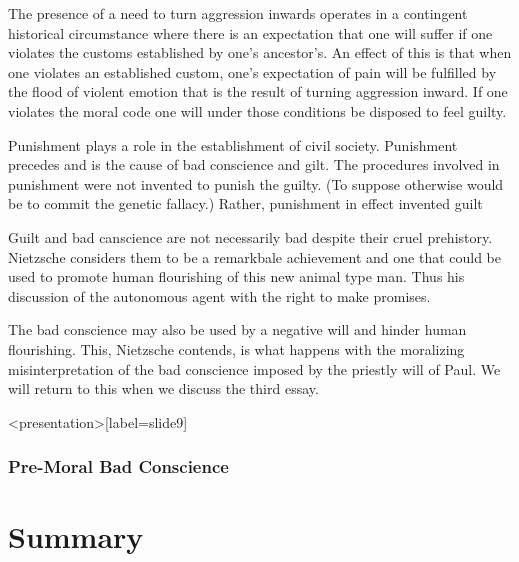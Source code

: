 The presence of a need to turn aggression inwards operates in a contingent historical circumstance where there is an expectation that one will suffer if one violates the customs established by one's ancestor's. An effect of this is that when one violates an established custom, one's expectation of pain will be fulfilled by the flood of violent emotion that is the result of turning aggression inward. If one violates the moral code one will under those conditions be disposed to feel guilty.

Punishment plays a role in the establishment of civil society. Punishment precedes and is the cause of bad conscience and gilt. The procedures involved in punishment were not invented to punish the guilty. (To suppose otherwise would be to commit the genetic fallacy.) Rather, punishment in effect invented guilt

Guilt and bad canscience are not necessarily bad despite their cruel prehistory. Nietzsche considers them to be a remarkbale achievement and one that could be used to promote human flourishing of this new animal type man. Thus his discussion of the autonomous agent with the right to make promises.

The bad conscience may also be used by a negative will and hinder human flourishing. This, Nietzsche contends, is what happens with the moralizing misinterpretation of the bad conscience imposed by the priestly will of Paul. We will return to this when we discuss the third essay.\change

\begin{frame}<presentation>[label=slide9]
    \frametitle{Pre-Moral Bad Conscience}
\end{frame}
\section*{Summary}


